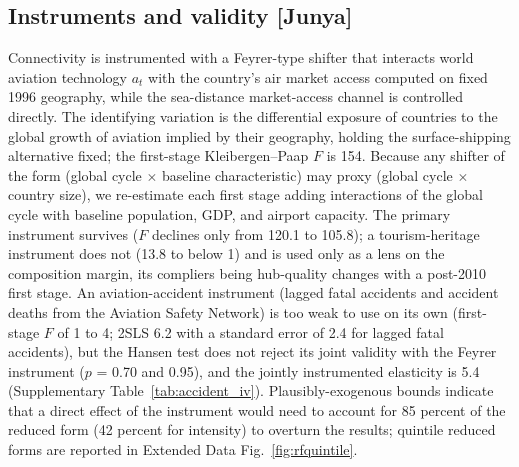 \documentclass[12pt]{article}
\begin{document}
\subsection*{Instruments and validity [Junya]}
Connectivity is instrumented with a Feyrer-type shifter that interacts
world aviation technology $a_t$ with the country's air market access
computed on fixed 1996 geography, while the sea-distance market-access
channel is controlled directly. The identifying variation is the
differential exposure of countries to the global growth of aviation implied
by their geography, holding the surface-shipping alternative fixed; the
first-stage Kleibergen--Paap $F$ is 154. Because any shifter of the form
(global cycle $\times$ baseline characteristic) may proxy (global cycle
$\times$ country size), we re-estimate each first stage adding interactions
of the global cycle with baseline population, GDP, and airport capacity.
The primary instrument survives ($F$ declines only from 120.1 to 105.8);
a tourism-heritage instrument does not (13.8 to below 1) and is used only
as a lens on the composition margin, its compliers being hub-quality
changes with a post-2010 first stage. An aviation-accident instrument
(lagged fatal accidents and accident deaths from the Aviation Safety
Network) is too weak to use on its own (first-stage $F$ of 1 to 4; 2SLS
6.2 with a standard error of 2.4 for lagged fatal accidents), but the
Hansen test does not reject its joint validity with the Feyrer instrument
($p$ = 0.70 and 0.95), and the jointly instrumented elasticity is 5.4
(Supplementary Table~\ref{tab:accident_iv}). Plausibly-exogenous bounds indicate that a direct
effect of the instrument would need to account for 85 percent of the
reduced form (42 percent for intensity) to overturn the results; quintile
reduced forms are reported in Extended Data Fig.~\ref{fig:rfquintile}.
\end{document}
